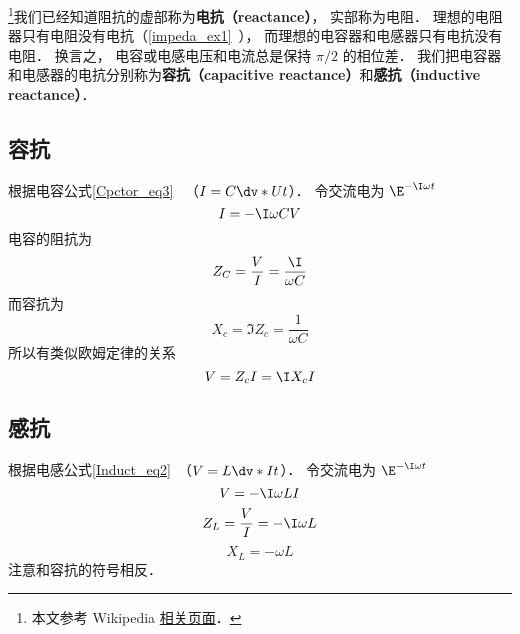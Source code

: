 

\footnote{本文参考 Wikipedia \href{https://en.wikipedia.org/wiki/Electrical_reactance}{相关页面}．}我们已经知道阻抗的虚部称为\textbf{电抗（reactance）}， 实部称为电阻． 理想的电阻器只有电阻没有电抗（\autoref{impeda_ex1}~）， 而理想的电容器和电感器只有电抗没有电阻． 换言之， 电容或电感电压和电流总是保持 $\pi/2$ 的相位差． 我们把电容器和电感器的电抗分别称为\textbf{容抗（capacitive reactance）}和\textbf{感抗（inductive reactance）}．

\subsection{容抗}
根据电容公式\autoref{Cpctor_eq3}~ （$I = C\dv*{U}{t}$）． 令交流电为 $\E^{-\I \omega t}$
\begin{equation}
I = -\I \omega CV
\end{equation}
电容的阻抗为
\begin{equation}
Z_C = \frac{V}{I} = \frac{\I}{\omega C}
\end{equation}
而容抗为
\begin{equation}
X_c = \Im{Z_c} = \frac{1}{\omega C}
\end{equation}
所以有类似欧姆定律的关系
\begin{equation}
V = Z_c I = \I X_c I
\end{equation}

\subsection{感抗}
根据电感公式\autoref{Induct_eq2}~（$V = L\dv*{I}{t}$）． 令交流电为 $\E^{-\I \omega t}$
\begin{equation}
V = -\I\omega L I
\end{equation}
\begin{equation}
Z_L = \frac{V}{I} = -\I\omega L
\end{equation}
\begin{equation}
X_L = -\omega L
\end{equation}
注意和容抗的符号相反．
